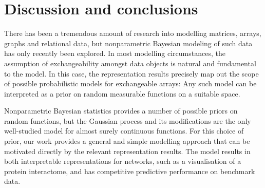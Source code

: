 
\section{Discussion and conclusions}

There has been a tremendous amount of research into modelling matrices, arrays, graphs and relational data, but nonparametric
Bayesian modeling of such data has only recently been explored.
In most modelling circumstances, the assumption of exchangeability amongst data objects is natural and fundamental to the model.
In this case, the representation results 
\citep{Aldous1981-lg,Hoover1979-br,Kallenberg1992-gb} 
precisely map out the scope of possible probabilistic models for exchangeable arrays:
Any such model can be interpreted as a prior on random measurable functions on a suitable space.

Nonparametric Bayesian statistics provides a number of possible priors on random functions, but the Gaussian process
and its modifications are the only well-studied model for almost surely continuous functions.
For this choice of prior, our work provides a general and simple modelling approach that can be motivated directly by the
relevant representation results.
The model results in both interpretable representations for networks, such as a visualisation of a protein interactome, and has 
competitive predictive performance on benchmark data.

